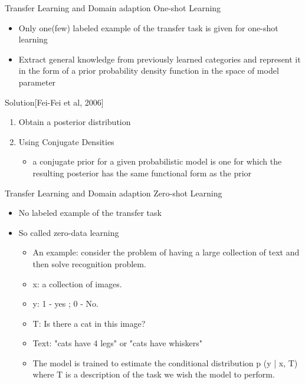 \begin{frame}{Transfer Learning and Domain adaption}
One-shot Learning
\begin{itemize}
  \item Only one(few) labeled example of the transfer task is given for one-shot learning
  \item Extract general knowledge from previously learned categories and represent it in the form of a prior probability density function in the space of model parameter
\end{itemize}
Solution[Fei-Fei et al, 2006]
\begin{enumerate} %
  \item Obtain a posterior distribution
  \item Using  Conjugate Densities
  \begin{itemize} %
    \item a conjugate prior for a given probabilistic model is one for which the resulting posterior has the same functional form as the prior
   \end{itemize}
\end{enumerate}
\end{frame}

\begin{frame}{Transfer Learning and Domain adaption}
Zero-shot Learning
\begin{itemize}
  \item No labeled example of the transfer task
  \item So called zero-data learning
   \begin{itemize}
   \item An example: consider the problem of having a large collection of text and then solve recognition problem.
   \item x: a collection of images.
   \item y: 1 - yes ; 0 - No.
   \item T: Is there a cat in this image?
   \item Text: "cats have 4 legs" or "cats have whiskers"
   \item The model is trained to estimate the conditional distribution p (y | x, T) where T is a description of the task we wish the model to perform.
   \end{itemize}
\end{itemize}
\end{frame}

